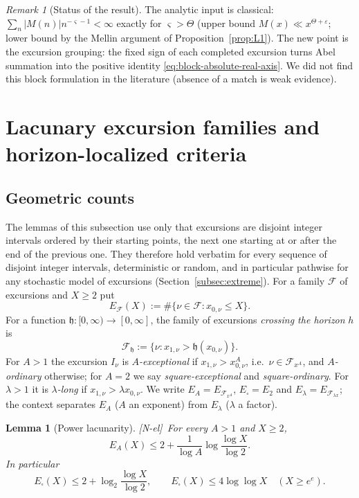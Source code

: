 \documentclass[11pt]{amsart}
\numberwithin{equation}{section}
\theoremstyle{plain}
\newtheorem{lemma}[theorem]{Lemma}
\theoremstyle{definition}
\theoremstyle{remark}
\newtheorem{remark}[theorem]{Remark}
\newcommand{\eps}{\varepsilon}
\newcommand{\F}{\mathcal{F}}
\newcommand{\tagNE}{\textup{[N-el]}}
\begin{document}
\begin{remark}[Status of the result]
\label{rem:block-abscissa-status}
The analytic input is classical: $\sum_n|M(n)|n^{-\varsigma-1}<\infty$
exactly for $\varsigma>\Theta$ (upper bound $M(x)\ll x^{\Theta+\eps}$;
lower bound by the Mellin argument of Proposition~\ref{prop:L1}). The new
point is the excursion grouping: the fixed sign of each completed excursion
turns Abel summation into the positive identity
\eqref{eq:block-absolute-real-axis}. We did not find this block
formulation in the literature (absence of a match is weak evidence).
\end{remark}


\section{Lacunary excursion families and horizon-localized criteria}
\label{sec:lacunary}

\subsection{Geometric counts}
\label{subsec:geometric}

The lemmas of this subsection use only that excursions are disjoint integer
intervals ordered by their starting points, the next one starting at or
after the end of the previous one. They therefore hold verbatim for every
sequence of disjoint integer intervals, deterministic or random, and in
particular pathwise for any stochastic model of excursions
(Section~\ref{subsec:extreme}). For a family $\F$ of excursions and $X\ge2$
put
\[
E_\F(X):=\#\{\nu\in\F:x_{0,\nu}\le X\}.
\]
For a function $\mathfrak h:[0,\infty)\to[0,\infty]$, the family of
excursions \emph{crossing the horizon} $h$ is
\[
\F_{\mathfrak h}:=\{\nu:x_{1,\nu}>\mathfrak h(x_{0,\nu})\}.
\]
For $A>1$ the excursion $I_\nu$ is \emph{$A$-exceptional} if
$x_{1,\nu}>x_{0,\nu}^A$, i.e.\ $\nu\in\F_{x^A}$, and \emph{$A$-ordinary}
otherwise; for $A=2$ we say \emph{square-exceptional} and
\emph{square-ordinary}. For $\lambda>1$ it is \emph{$\lambda$-long} if
$x_{1,\nu}>\lambda x_{0,\nu}$. We write $E_A=E_{\F_{x^A}}$,
$E_\square=E_2$ and $E_\lambda=E_{\F_{\lambda x}}$; the context separates
$E_A$ ($A$ an exponent) from $E_\lambda$ ($\lambda$ a factor).

\begin{lemma}[Power lacunarity]
\label{lem:power-lacunary}
\tagNE\ For every $A>1$ and $X\ge2$,
\begin{equation}
\label{eq:power-lacunary-count}
E_A(X)\le2+\frac1{\log A}\log\frac{\log X}{\log2}.
\end{equation}
In particular
\begin{equation}
\label{eq:square-exception-count}
E_\square(X)\le2+\log_2\frac{\log X}{\log2},\qquad
E_\square(X)\le4\log\log X\quad(X\ge e^e).
\end{equation}
\end{lemma}
\end{document}
